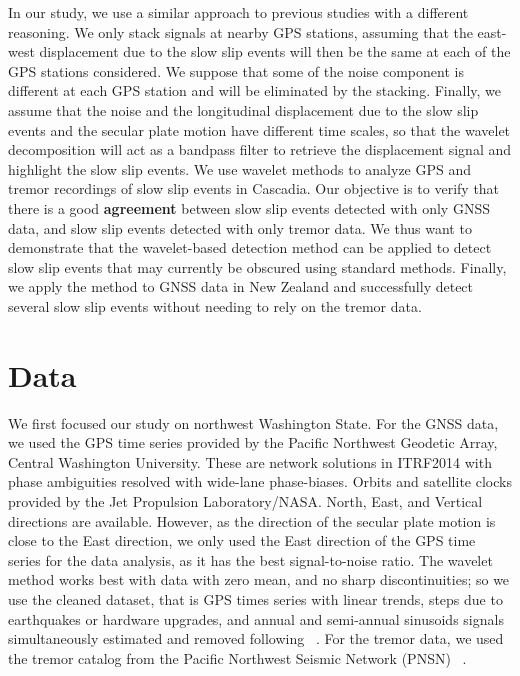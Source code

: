 \documentclass{article}
\begin{document}
In our study, we use a similar approach to previous studies with a different reasoning. We only stack signals at nearby GPS stations, assuming that the east-west displacement due to the slow slip events will then be the same at each of the GPS stations considered. We suppose that some of the noise component is different at each GPS station and will be eliminated by the stacking. Finally, we assume that the noise and the longitudinal displacement due to the slow slip events and the secular plate motion have different time scales, so that the wavelet decomposition will act as a bandpass filter to retrieve the displacement signal and highlight the slow slip events. We use wavelet methods to analyze GPS and tremor recordings of slow slip events in Cascadia. Our objective is to verify that there is a good \textbf{agreement} between slow slip events detected with only GNSS data, and slow slip events detected with only tremor data. We thus want to demonstrate that the wavelet-based detection method can be applied to detect slow slip events that may currently be obscured using standard methods. Finally, we apply the method to GNSS data in New Zealand and successfully detect several slow slip events without needing to rely on the tremor data. \\

\section{Data}

We first focused our study on northwest Washington State. For the GNSS data, we used the GPS time series provided by the Pacific Northwest Geodetic Array, Central Washington University. These are network solutions in ITRF2014 with phase ambiguities resolved with wide-lane phase-biases. Orbits and satellite clocks provided by the Jet Propulsion Laboratory/NASA. North, East, and Vertical directions are available. However, as the direction of the secular plate motion is close to the East direction, we only used the East direction of the GPS time series for the data analysis, as it has the best signal-to-noise ratio. The wavelet method works best with data with zero mean, and no sharp discontinuities; so we use the cleaned dataset, that is GPS times series with linear trends, steps due to earthquakes or hardware upgrades, and annual and semi-annual sinusoids signals simultaneously estimated and removed following ~\citet{SZE_2004}. For the tremor data, we used the tremor catalog from the Pacific Northwest Seismic Network (PNSN) ~\citep{WEC_2010}. \\
\end{document}
